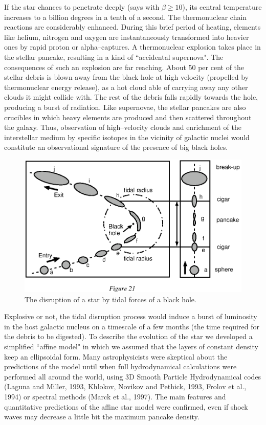 \documentclass[12pt]{article}
\begin{document}
If the star chances to penetrate deeply (says with $\beta \geq 10$), 
its central temperature increases to a billion degrees in a tenth of a 
second. The thermonuclear chain reactions are considerably enhanced. 
During this brief period of heating, elements like helium, nitrogen and 
oxygen are instantaneously transformed into heavier ones by rapid 
proton or alpha--captures. A thermonuclear explosion 
takes place in the stellar pancake, resulting in a kind of 
``accidental supernova". The consequences of such an explosion are far 
reaching. About 50 per cent of the stellar debris is blown away from 
the black hole at high velocity (propelled by thermonuclear energy 
release), as a hot cloud able of carrying away any other clouds it 
might collide with. The rest of the debris falls rapidly towards the 
hole, producing a burst of radiation. Like supernovae, the stellar 
pancakes are also crucibles in which heavy elements are produced and 
then scattered throughout the galaxy. Thus, 
observation of high--velocity clouds and enrichment of 
the interstellar medium by specific isotopes in the vicinity of galactic nuclei would 
constitute an observational signature of the presence of big black holes.

\begin{figure}[tb]
  \begin{center}
    \leavevmode
    \includegraphics{tidal.ps}
\caption{The disruption of a star by tidal forces of a black hole.}
  \end{center}
\end{figure}
Explosive or 
not, the tidal disruption process would induce a burst of luminosity 
in the host galactic nucleus on a timescale of a few months (the time required 
for the debris to be digested).
To describe the evolution of the star we developed a simplified 
``affine model" in which we assumed that the layers of constant 
density keep an ellipsoidal form. Many astrophysicists were skeptical 
about the predictions of the model until when full hydrodynamical calculations were 
performed all around the world, using 3D Smooth Particle 
Hydrodynamical codes (Laguna and Miller, 1993, Khlokov, Novikov and 
Pethick, 1993, Frolov et al., 1994) or spectral methods (Marck et 
al., 1997). The main features and quantitative predictions of the 
affine star model were confirmed, even if shock waves may decrease a 
little bit the maximum pancake density.
\end{document}
